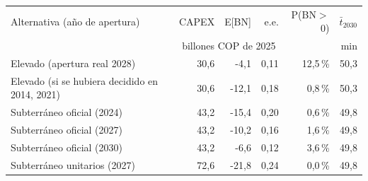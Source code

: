 \begin{tabular}{p{6.2cm}rrrrr}
\toprule
Alternativa (año de apertura) & CAPEX & E[BN] & e.e. & P(BN$>$0) & $\bar t_{2030}$ \\
 & \multicolumn{3}{c}{billones COP de 2025} & & min \\
\midrule
Elevado (apertura real 2028) & 30,6 & -4,1 & 0,11 & 12,5\,\% & 50,3 \\
Elevado (si se hubiera decidido en 2014, 2021) & 30,6 & -12,1 & 0,18 & 0,8\,\% & 50,3 \\
Subterráneo oficial (2024) & 43,2 & -15,4 & 0,20 & 0,6\,\% & 49,8 \\
Subterráneo oficial (2027) & 43,2 & -10,2 & 0,16 & 1,6\,\% & 49,8 \\
Subterráneo oficial (2030) & 43,2 & -6,6 & 0,12 & 3,6\,\% & 49,8 \\
Subterráneo unitarios (2027) & 72,6 & -21,8 & 0,24 & 0,0\,\% & 49,8 \\
\bottomrule
\end{tabular}
